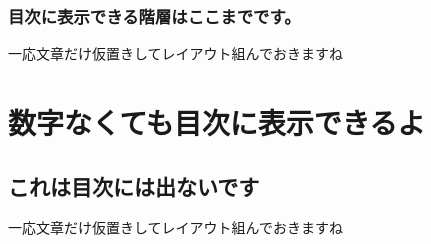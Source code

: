\documentclass{ltjsreport}
\begin{document}
        \subsection{目次に表示できる階層はここまでです。}
        一応文章だけ仮置きしてレイアウト組んでおきますね



\chapter*{数字なくても目次に表示できるよ}

\section*{これは目次には出ないです}
一応文章だけ仮置きしてレイアウト組んでおきますね






%

\end{document}
